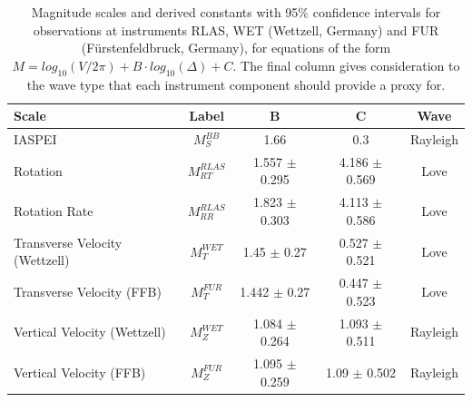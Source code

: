 \documentclass{gji}
\begin{document}
\begin{table}
\begin{minipage}{115mm}
	\begin{center}
		\begin{tabular}{ |l|c|c|c|c| } 
		        \bf{Scale} & \bf{Label} & \bf{B} & \bf{C}  & \bf{Wave}\\ \hline
	IASPEI & $M_{S}^{BB}$ & 1.66 & 0.3  & Rayleigh \\ \hline
        Rotation  & $M^{RLAS}_{RT}$ & 1.557 $\pm$ 0.295 & 4.186 $\pm$ 0.569  & Love \\ \hline
	Rotation Rate & $M^{RLAS}_{RR}$ & 1.823 $\pm$ 0.303 & 4.113 $\pm$ 0.586  & Love\\ \hline 
        Transverse Velocity (Wettzell) & $M^{WET}_T$ & 1.45 $\pm$ 0.27 & 0.527 $\pm$ 0.521 & Love \\ \hline
        Transverse Velocity (FFB) & $M^{FUR}_T$ & 1.442 $\pm$ 0.27 & 0.447 $\pm$ 0.523 & Love \\ \hline
        Vertical Velocity (Wettzell) & $M^{WET}_Z$ & 1.084 $\pm$ 0.264 & 1.093 $\pm$ 0.511  & Rayleigh \\ \hline
        Vertical Velocity (FFB) & $M^{FUR}_Z$ & 1.095 $\pm$ 0.259 & 1.09 $\pm$ 0.502  & Rayleigh \\ \hline
		\end{tabular}
		
    		\caption{Magnitude scales and derived constants with 95\% confidence intervals for observations at instruments RLAS, WET (Wettzell, Germany) and FUR (F\"urstenfeldbruck, Germany), for equations of the form $M = log_{10}(V/2\pi) + B\cdot log_{10}(\Delta) + C$. The final column gives consideration to the wave type that each instrument component should provide a proxy for.}
		\label{tab:scales}
	\end{center}
	\end{minipage}
\end{table}
\end{document}
